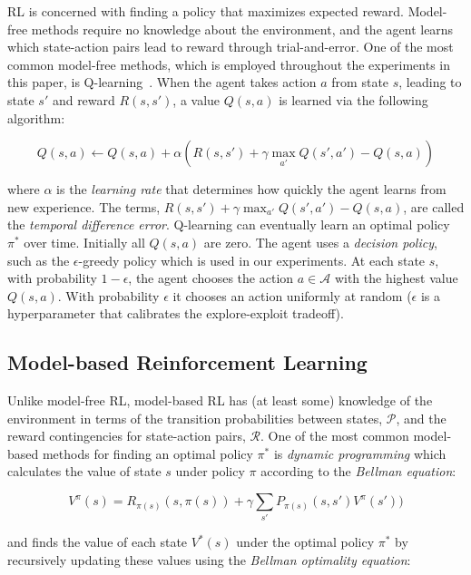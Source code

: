 \documentclass[letterpaper]{article}
\begin{document}
RL is concerned with finding a policy that maximizes expected reward. Model-free methods require no knowledge about the environment, and the agent learns which state-action pairs lead to reward through trial-and-error. One of the most common model-free methods, which is employed throughout the experiments in this paper, is Q-learning~\cite{sutton1998reinforcement}. When the agent takes action $a$ from state $s$, leading to state $s'$ and reward $R(s,s')$, a value $Q(s,a)$ is learned via the following algorithm:

\begin{equation}
Q(s,a) \leftarrow Q(s,a) + \alpha (R(s, s') + \gamma \max_{a'} Q(s', a') - Q(s,a))
\end{equation}

\noindent
where $\alpha$ is the \textit{learning rate} that determines how quickly the agent learns from new experience. The terms, $R(s, s') + \gamma \max_{a'} Q(s', a') - Q(s,a)$, are called the \textit{temporal difference error}. Q-learning can eventually learn an optimal policy $\pi^*$ over time. Initially all $Q(s,a)$ are zero. The agent uses a \textit{decision policy}, such as the $\epsilon$-greedy policy which is used in our experiments. At each state $s$, with probability $1 - \epsilon$, the agent chooses the action $a \in \mathcal{A}$ with the highest value $Q(s,a)$. With probability $\epsilon$ it chooses an action uniformly at random ($\epsilon$ is a hyperparameter that calibrates the explore-exploit tradeoff).
 
\subsection{Model-based Reinforcement Learning}

Unlike model-free RL, model-based RL has (at least some) knowledge of the environment in terms of the transition probabilities between states, $\mathcal{P}$, and the reward contingencies for state-action pairs, $\mathcal{R}$. One of the most common model-based methods for finding an optimal policy $\pi^*$ is \textit{dynamic programming} which calculates the value of state $s$ under policy $\pi$ according to the \textit{Bellman equation}:

\begin{equation}
V^{\pi}(s) = R_{\pi(s)}(s,\pi(s)) + \gamma \sum\limits_{s'} P_{\pi(s)}(s,s')V^{\pi}(s'))
\end{equation}

\noindent
and finds the value of each state $V^{*}(s)$ under the optimal policy $\pi^*$ by recursively updating these values using the \textit{Bellman optimality equation}:
\end{document}
